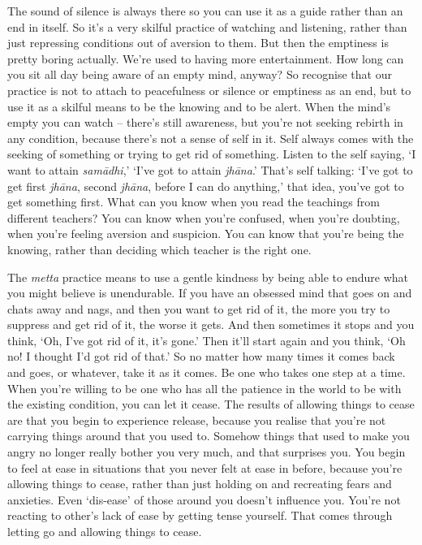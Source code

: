 The sound of silence is always there so you can use it as a guide rather than an end in itself. So it's a very skilful practice of watching and listening, rather than just repressing conditions out of aversion to them. But then the emptiness is pretty boring actually. We're used to having more entertainment. How long can you sit all day being aware of an empty mind, anyway? So recognise that our practice is not to attach to peacefulness or silence or emptiness as an end, but to use it as a skilful means to be the knowing and to be alert. When the mind's empty you can watch -- there's still awareness, but you're not seeking rebirth in any condition, because there's not a sense of self in it. Self always comes with the seeking of something or trying to get rid of something. Listen to the self saying, `I want to attain \textit{sam\=adhi},' `I've got to attain \textit{jh\=ana}.' That's self talking: `I've got to get first \textit{jh\=ana}, second \textit{jh\=ana}, before I can do anything,' that idea, you've got to get something first. What can you know when you read the teachings from different teachers? You can know when you're confused, when you're doubting, when you're feeling aversion and suspicion. You can know that you're being the knowing, rather than deciding which teacher is the right one.

The \textit{metta} practice means to use a gentle kindness by being able to endure what you might believe is unendurable. If you have an obsessed mind that goes on and chats away and nags, and then you want to get rid of it, the more you try to suppress and get rid of it, the worse it gets. And then sometimes it stops and you think, `Oh, I've got rid of it, it's gone.' Then it'll start again and you think, `Oh no! I thought I'd got rid of that.' So no matter how many times it comes back and goes, or whatever, take it as it comes. Be one who takes one step at a time. When you're willing to be one who has all the patience in the world to be with the existing condition, you can let it cease. The results of allowing things to cease are that you begin to experience release, because you realise that you're not carrying things around that you used to. Somehow things that used to make you angry no longer really bother you very much, and that surprises you. You begin to feel at ease in situations that you never felt at ease in before, because you're allowing things to cease, rather than just holding on and recreating fears and anxieties. Even `dis-ease' of those around you doesn't influence you. You're not reacting to other's lack of ease by getting tense yourself. That comes through letting go and allowing things to cease.

